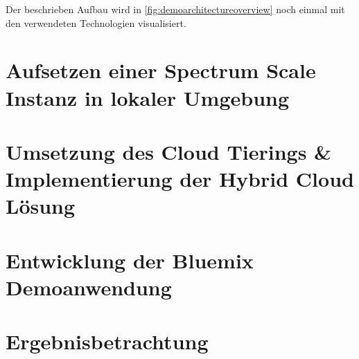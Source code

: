 Der beschrieben Aufbau wird in \autoref{fig:demoarchitectureoverview} noch einmal mit den verwendeten Technologien visualisiert. 

\section{Aufsetzen einer Spectrum Scale Instanz in lokaler Umgebung}


\section{Umsetzung des Cloud Tierings \& Implementierung der Hybrid Cloud Lösung}


\section{Entwicklung der Bluemix Demoanwendung}


\section{Ergebnisbetrachtung}
